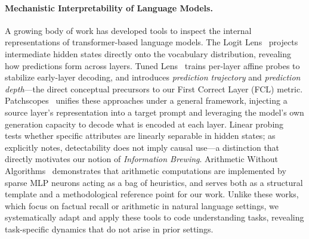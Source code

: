 \documentclass[11pt]{article}
\begin{document}
\paragraph{Mechanistic Interpretability of Language Models.}
A growing body of work has developed tools to inspect the internal representations of transformer-based language models.
The Logit Lens~\citep{nostalgebraist2020} projects intermediate hidden states directly onto the vocabulary distribution, revealing how predictions form across layers.
Tuned Lens~\citep{belrose2023tunedlens} trains per-layer affine probes to stabilize early-layer decoding, and introduces \emph{prediction trajectory} and \emph{prediction depth}---the direct conceptual precursors to our First Correct Layer (FCL) metric.
Patchscopes~\citep{ghandeharioun2024patchscopes} unifies these approaches under a general framework, injecting a source layer's representation into a target prompt and leveraging the model's own generation capacity to decode what is encoded at each layer.
Linear probing~\citep{belinkov2022probing} tests whether specific attributes are linearly separable in hidden states; as \citet{belinkov2022probing} explicitly notes, detectability does not imply causal use---a distinction that directly motivates our notion of \emph{Information Brewing}.
Arithmetic Without Algorithms~\citep{nikankin2025arithmetic} demonstrates that arithmetic computations are implemented by sparse MLP neurons acting as a bag of heuristics, and serves both as a structural template and a methodological reference point for our work.
Unlike these works, which focus on factual recall or arithmetic in natural language settings, we systematically adapt and apply these tools to code understanding tasks, revealing task-specific dynamics that do not arise in prior settings.
 
\end{document}
